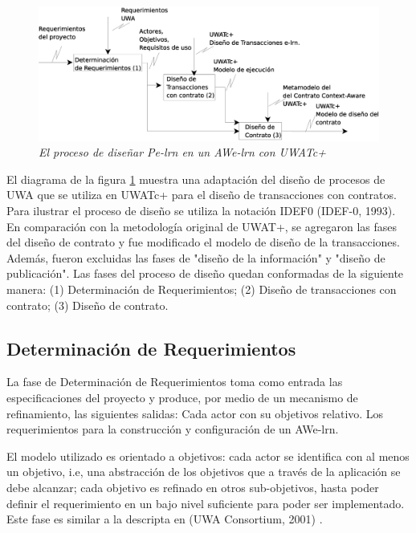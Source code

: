 	\begin{figure}[!h]
        \begin{center}
	\includegraphics[width=6 in,totalheight=2 in]{procesodisenoNuevo.eps}
	\caption{\small \sl El proceso de diseñar Pe-lrn en un AWe-lrn con
UWATc+} \label{procesodediseno}
         \end{center}
         \end{figure}



El diagrama de la figura \ref{procesodediseno} muestra una adaptación del diseño
de procesos de UWA \cite{UWA} que se utiliza en UWATc+ para el diseño de
transacciones con contratos. Para ilustrar el proceso de diseño se utiliza la
notación IDEF0 (IDEF-0, 1993). En comparación con la metodología original de
UWAT+, se agregaron las fases del diseño de contrato y fue modificado el modelo
de diseño de la transacciones. Además, fueron excluidas las fases de "diseño de
la información" y "diseño de publicación". Las fases del proceso de diseño
quedan conformadas de la siguiente manera: (1) Determinación de Requerimientos;
(2) Diseño de transacciones con contrato; (3) Diseño de contrato.

\subsection{Determinación de Requerimientos} \label{sdr}

La fase de Determinación de Requerimientos toma como entrada las
especificaciones del proyecto y produce, por medio de un mecanismo de
refinamiento, las siguientes salidas: Cada actor con su objetivos relativo. Los
requerimientos para la construcción y configuración de un AWe-lrn.
 
El modelo utilizado es orientado a objetivos: cada actor se identifica con al
menos un objetivo, i.e, una abstracción de los objetivos que a través de la
aplicación se debe alcanzar; cada objetivo es refinado en otros sub-objetivos,
hasta poder definir el requerimiento en un bajo nivel suficiente para poder ser
implementado. Este fase es similar a la descripta en (UWA Consortium, 2001)
\cite{UWA}. 

